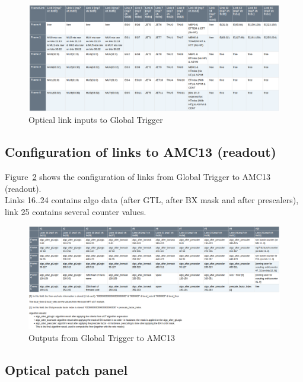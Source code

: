 \begin{figure}[htb]
\centering
\includegraphics[width=15cm]{figures/ugt_inputs}
\caption{Optical link inputs to Global Trigger}
\label{fig:app:ugt_inputs}
\end{figure}

\subsection{Configuration of links to AMC13 (readout)}\label{sec:app:app_c}

Figure~\ref{fig:app:ugt_outputs} shows the configuration of links from Global Trigger to AMC13 (readout).\\
Links 16..24 contains algo data (after GTL, after BX mask and after prescalers), link 25 contains several counter values.

\begin{figure}[htb]
\centering
\includegraphics[width=15cm]{figures/ugt_outputs}
\caption{Outputs from Global Trigger to AMC13}
\label{fig:app:ugt_outputs}
\end{figure}

\clearpage

\subsection{Optical patch panel}\label{sec:app:app_d}

